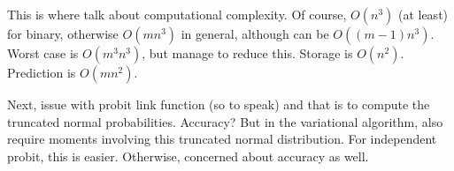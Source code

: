 
This is where talk about computational complexity.
Of course, $O(n^3)$ (at least) for binary, otherwise $O(mn^3)$ in general, although can be $O((m-1)n^3)$.
Worst case is $O(m^3n^3)$, but manage to reduce this.
Storage is $O(n^2)$. 
Prediction is $O(mn^2)$.

Next, issue with probit link function (so to speak) and that is to compute the truncated normal probabilities.
Accuracy?
But in the variational algorithm, also require moments involving this truncated normal distribution. 
For independent probit, this is easier.
Otherwise, concerned about accuracy as well.